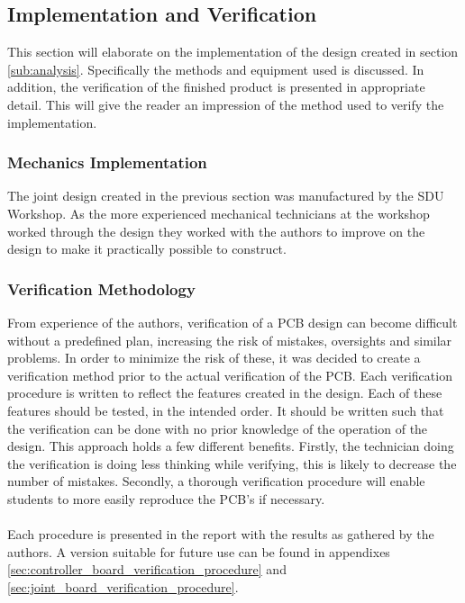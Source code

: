 \subsection{Implementation and Verification} %
\label{sub:implementation_and_verification}
This section will elaborate on the implementation of the design created in section \ref{sub:analysis}.
Specifically the methods and equipment used is discussed.
In addition, the verification of the finished product is presented in appropriate detail.
This will give the reader an impression of the method used to verify the implementation.
\subsubsection{Mechanics Implementation} %
\label{ssub:mechanics_implementation}
The joint design created in the previous section was manufactured by the SDU Workshop.
As the more experienced mechanical technicians at the workshop worked through the design they worked with the authors to improve on the design to make it practically possible to construct.  
\subsubsection{Verification Methodology} %
\label{ssub:testing_methodology}
From experience of the authors, verification of a PCB design can become difficult without a predefined plan, increasing the risk of mistakes, oversights and similar problems.
In order to minimize the risk of these, it was decided to create a verification method prior to the actual verification of the PCB.
Each verification procedure is written to reflect the features created in the design.
Each of these features should be tested, in the intended order.
It should be written such that the verification can be done with no prior knowledge of the operation of the design.
This approach holds a few different benefits.
Firstly, the technician doing the verification is doing less thinking while verifying, this is likely to decrease the number of mistakes.
Secondly, a thorough verification procedure will enable students to more easily reproduce the PCB's if necessary.\\~\\
Each procedure is presented in the report with the results as gathered by the authors.
A version suitable for future use can be found in appendixes \ref{sec:controller_board_verification_procedure} and \ref{sec:joint_board_verification_procedure}.

